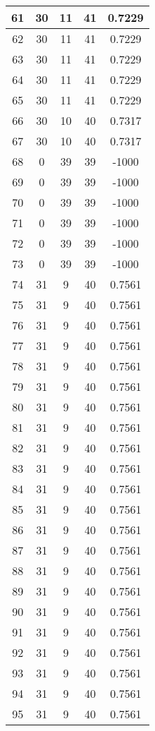 \documentclass[letterpaper, 12pt]{article}
\begin{document}
\begin{longtable}{|c|c|c|c|c|}
\hline
61 & 30 & 11 & 41 & 0.7229 \\
\hline
62 & 30 & 11 & 41 & 0.7229 \\
\hline
63 & 30 & 11 & 41 & 0.7229 \\
\hline
64 & 30 & 11 & 41 & 0.7229 \\
\hline
65 & 30 & 11 & 41 & 0.7229 \\
\hline
66 & 30 & 10 & 40 & 0.7317 \\
\hline
67 & 30 & 10 & 40 & 0.7317 \\
\hline
68 & 0 & 39 & 39 & -1000 \\
\hline
69 & 0 & 39 & 39 & -1000 \\
\hline
70 & 0 & 39 & 39 & -1000 \\
\hline
71 & 0 & 39 & 39 & -1000 \\
\hline
72 & 0 & 39 & 39 & -1000 \\
\hline
73 & 0 & 39 & 39 & -1000 \\
\hline
74 & 31 & 9 & 40 & 0.7561 \\
\hline
75 & 31 & 9 & 40 & 0.7561 \\
\hline
76 & 31 & 9 & 40 & 0.7561 \\
\hline
77 & 31 & 9 & 40 & 0.7561 \\
\hline
78 & 31 & 9 & 40 & 0.7561 \\
\hline
79 & 31 & 9 & 40 & 0.7561 \\
\hline
80 & 31 & 9 & 40 & 0.7561 \\
\hline
81 & 31 & 9 & 40 & 0.7561 \\
\hline
82 & 31 & 9 & 40 & 0.7561 \\
\hline
83 & 31 & 9 & 40 & 0.7561 \\
\hline
84 & 31 & 9 & 40 & 0.7561 \\
\hline
85 & 31 & 9 & 40 & 0.7561 \\
\hline
86 & 31 & 9 & 40 & 0.7561 \\
\hline
87 & 31 & 9 & 40 & 0.7561 \\
\hline
88 & 31 & 9 & 40 & 0.7561 \\
\hline
89 & 31 & 9 & 40 & 0.7561 \\
\hline
90 & 31 & 9 & 40 & 0.7561 \\
\hline
91 & 31 & 9 & 40 & 0.7561 \\
\hline
92 & 31 & 9 & 40 & 0.7561 \\
\hline
93 & 31 & 9 & 40 & 0.7561 \\
\hline
94 & 31 & 9 & 40 & 0.7561 \\
\hline
95 & 31 & 9 & 40 & 0.7561 \\

\end{longtable}
\end{document}
